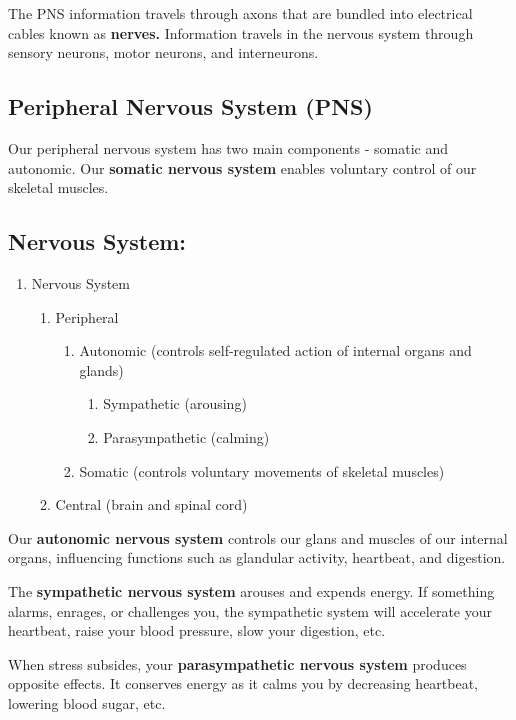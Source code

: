 The PNS information travels through axons that are bundled into electrical cables known as \textbf{nerves.} Information travels in the nervous system through sensory neurons, motor neurons, and interneurons.

\subsection*{Peripheral Nervous System (PNS)}
Our peripheral nervous system has  two main components - somatic and autonomic. Our \textbf{somatic nervous system} enables voluntary control of our skeletal muscles.

\subsection*{Nervous System:}
\begin{enumerate}
  \item Nervous System
  \begin{enumerate}
    \item Peripheral
    \begin {enumerate}
      \item Autonomic (controls self-regulated action of internal organs and glands)
      \begin{enumerate}
        \item Sympathetic (arousing)
        \item Parasympathetic (calming)
      \end{enumerate}
      \item Somatic (controls voluntary movements of skeletal muscles)
    \end{enumerate}
    \item Central (brain and spinal cord)
  \end{enumerate}
\end{enumerate}
    
Our \textbf{autonomic nervous system} controls our glans and muscles of our internal organs, influencing functions such as glandular activity, heartbeat, and digestion. 

The \textbf{sympathetic nervous system} arouses and expends energy. If something alarms, enrages, or challenges you, the sympathetic system will accelerate your heartbeat, raise your blood pressure, slow your digestion, etc.

When stress subsides, your \textbf{parasympathetic nervous system} produces opposite effects. It conserves energy as it calms you by decreasing heartbeat, lowering blood sugar, etc. 

